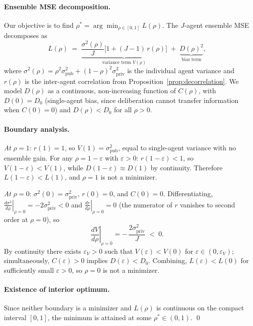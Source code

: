 \paragraph{Ensemble MSE decomposition.}
Our objective is to find $\rho^* = \arg\min_{\rho \in [0,1]} L(\rho)$.
The $J$-agent ensemble MSE decomposes as
\begin{equation}
L(\rho) \;=\; \underbrace{\frac{\sigma^2(\rho)}{J}\bigl[1+(J{-}1)\,r(\rho)\bigr]}_{\text{variance term } V(\rho)}
\;+\; \underbrace{D(\rho)^2}_{\text{bias term}},
\end{equation}
where $\sigma^2(\rho) = \rho^2\sigma_{\mathrm{pub}}^2 + (1{-}\rho)^2\sigma_{\mathrm{priv}}^2$ is the individual agent variance and $r(\rho)$ is the inter-agent correlation from Proposition~\ref{prop:decorrelation}.
We model $D(\rho)$ as a continuous, non-increasing function of $C(\rho)$, with $D(0) = D_0$ (single-agent bias, since deliberation cannot transfer information when $C(0) = 0$) and $D(\rho) < D_0$ for all $\rho > 0$.

\paragraph{Boundary analysis.}
\textit{At $\rho = 1$}: $r(1) = 1$, so $V(1) = \sigma_{\mathrm{pub}}^2$, equal to single-agent variance with no ensemble gain.
For any $\rho = 1 - \varepsilon$ with $\varepsilon > 0$: $r(1{-}\varepsilon) < 1$, so $V(1{-}\varepsilon) < V(1)$, while $D(1{-}\varepsilon) \approx D(1)$ by continuity.
Therefore $L(1{-}\varepsilon) < L(1)$, and $\rho = 1$ is not a minimizer.

\textit{At $\rho = 0$}: $\sigma^2(0) = \sigma_{\mathrm{priv}}^2$, $r(0) = 0$, and $C(0) = 0$.
Differentiating,
$\left.\frac{d\sigma^2}{d\rho}\right|_{\rho=0} = -2\sigma_{\mathrm{priv}}^2 < 0$ and
$\left.\frac{dr}{d\rho}\right|_{\rho=0} = 0$
(the numerator of $r$ vanishes to second order at $\rho = 0$), so
\begin{equation}
\left.\frac{dV}{d\rho}\right|_{\rho=0} = -\,\frac{2\sigma_{\mathrm{priv}}^2}{J} \;<\; 0.
\end{equation}
By continuity there exists $\varepsilon_V > 0$ such that $V(\varepsilon) < V(0)$ for $\varepsilon \in (0, \varepsilon_V)$; simultaneously, $C(\varepsilon) > 0$ implies $D(\varepsilon) < D_0$.
Combining, $L(\varepsilon) < L(0)$ for sufficiently small $\varepsilon > 0$, so $\rho = 0$ is not a minimizer.

\paragraph{Existence of interior optimum.}
Since neither boundary is a minimizer and $L(\rho)$ is continuous on the compact interval $[0,1]$, the minimum is attained at some $\rho^* \in (0,1)$. \qed

